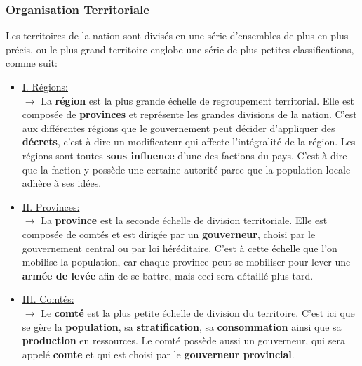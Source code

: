 \documentclass{article}
\begin{document}
            \subsubsection{Organisation Territoriale}
                Les territoires de la nation sont divisés en une série d'ensembles de plus en plus précis, ou le plus grand territoire englobe une série de plus petites classifications, comme suit:
                    \begin{itemize}
                        \item \underline{I. Régions: } \\
                            $\rightarrow$ La \textbf{région} est la plus grande échelle de regroupement territorial. Elle est composée de \textbf{provinces} et représente les grandes divisions de la nation. C'est aux différentes régions que le gouvernement peut décider d'appliquer des \textbf{décrets}, c'est-à-dire un modificateur qui affecte l'intégralité de la région. Les régions sont toutes \textbf{sous influence} d'une des factions du pays. C'est-à-dire que la faction y possède une certaine autorité parce que la population locale adhère à ses idées.
                        \item \underline{II. Provinces: } \\
                            $\rightarrow$ La \textbf{province} est la seconde échelle de division territoriale. Elle est composée de comtés et est dirigée par un \textbf{gouverneur}, choisi par le gouvernement central ou par loi héréditaire. C'est à cette échelle que l'on mobilise la population, car chaque province peut se mobiliser pour lever une \textbf{armée de levée} afin de se battre, mais ceci sera détaillé plus tard.
                        \item \underline{III. Comtés: } \\
                            $\rightarrow$ Le \textbf{comté} est la plus petite échelle de division du territoire. C'est ici que se gère la \textbf{population}, sa \textbf{stratification}, sa \textbf{consommation} ainsi que sa \textbf{production} en ressources. Le comté possède aussi un gouverneur, qui sera appelé \textbf{comte} et qui est choisi par le \textbf{gouverneur provincial}.
                    \end{itemize}
                    
\end{document}

